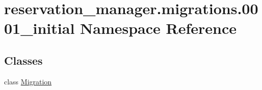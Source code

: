 \hypertarget{namespacereservation__manager_1_1migrations_1_10001__initial}{\section{reservation\-\_\-manager.\-migrations.0001\-\_\-initial Namespace Reference}
\label{namespacereservation__manager_1_1migrations_1_10001__initial}
}
\subsection*{Classes}
\begin{DoxyCompactItemize}
\item 
class \hyperlink{classreservation__manager_1_1migrations_1_10001__initial_1_1Migration}{Migration}
\end{DoxyCompactItemize}
